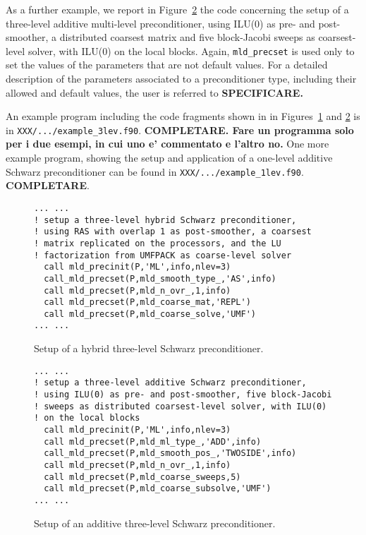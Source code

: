 As a further example, we report in Figure~\ref{fig:example3} the code
concerning the setup of a three-level additive multi-level preconditioner,
using ILU(0) as pre- and post-smoother, a distributed coarsest matrix and
five block-Jacobi sweeps as coarsest-level solver, with
ILU(0) on the local blocks. Again, \verb|mld_precset| is used only to set
the values of the parameters that are not default values.
For a detailed description of the parameters associated to a preconditioner
type, including their allowed and default values, the user is referred to
\textbf{SPECIFICARE.} 

An example program including the code fragments
shown in in Figures~\ref{fig:example2} and \ref{fig:example3} is in
\verb|XXX/.../example_3lev.f90|. \textbf{COMPLETARE. Fare un programma solo
per i due esempi, in cui uno e' commentato e l'altro no.}
One more example program, showing the setup and application of a one-level
additive Schwarz preconditioner can be found in \verb|XXX/.../example_1lev.f90|.
\textbf{COMPLETARE}.

\begin{figure}[tbp]
\begin{center}
{\small
\begin{verbatim}
... ...
! setup a three-level hybrid Schwarz preconditioner,
! using RAS with overlap 1 as post-smoother, a coarsest
! matrix replicated on the processors, and the LU
! factorization from UMFPACK as coarse-level solver
  call mld_precinit(P,'ML',info,nlev=3)
  call_mld_precset(P,mld_smooth_type_,'AS',info)
  call mld_precset(P,mld_n_ovr_,1,info)
  call mld_precset(P,mld_coarse_mat,'REPL')
  call mld_precset(P,mld_coarse_solve,'UMF')
... ...
\end{verbatim}
}
\caption{Setup of a hybrid three-level Schwarz preconditioner.\label{fig:example2}}
\end{center}
\end{figure}

\begin{figure}[tbp]
\begin{center}
{\small
\begin{verbatim}
... ...
! setup a three-level additive Schwarz preconditioner,
! using ILU(0) as pre- and post-smoother, five block-Jacobi
! sweeps as distributed coarsest-level solver, with ILU(0)
! on the local blocks
  call mld_precinit(P,'ML',info,nlev=3)
  call mld_precset(P,mld_ml_type_,'ADD',info)
  call_mld_precset(P,mld_smooth_pos_,'TWOSIDE',info)
  call mld_precset(P,mld_n_ovr_,1,info)
  call mld_precset(P,mld_coarse_sweeps,5)
  call mld_precset(P,mld_coarse_subsolve,'UMF')
... ...
\end{verbatim}
}
\caption{Setup of an additive three-level Schwarz preconditioner.\label{fig:example3}}
\end{center}
\end{figure}


